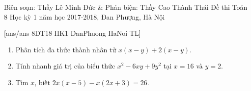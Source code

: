 \begin{name}
{Biên soạn: Thầy Lê Minh Đức \& Phản biện: Thầy Cao Thành Thái}
{Đề thi Toán 8 Học kỳ 1 năm học 2017-2018, Đan Phượng, Hà Nội }
\end{name}
\setcounter{bt}{0}
[ans/ans-8DT18-HK1-DanPhuong-HaNoi-TL]
\begin{bt}%
	\begin{enumerate}
		\item Phân tích đa thức thành nhân tử $x\left( x-y \right) + 2\left( x-y \right)$.
		\item Tính nhanh giá trị của biểu thức $x^2-6xy + 9y^2$ tại $x = 16$ và $y = 2$.
		\item Tìm $x$, biết $2x\left( x-5 \right)-x\left( 2x + 3 \right) = 26$. 
	\end{enumerate}
\end{bt}
